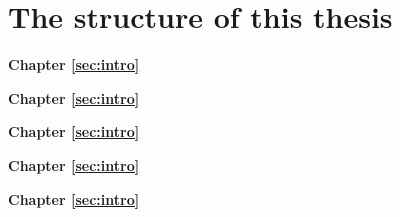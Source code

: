 \section{The structure of this thesis}
\label{sec:intro:structure}

\textbf{Chapter \ref{sec:intro}} \\[0.2em]
\blindtext

\textbf{Chapter \ref{sec:intro}} \\[0.2em]
\blindtext

\textbf{Chapter \ref{sec:intro}} \\[0.2em]
\blindtext

\textbf{Chapter \ref{sec:intro}} \\[0.2em]
\blindtext

\textbf{Chapter \ref{sec:intro}} \\[0.2em]
\blindtext
